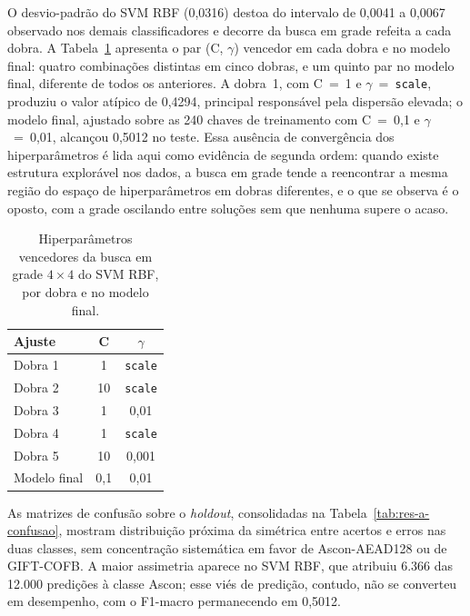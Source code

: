 O desvio-padrão do SVM RBF (0,0316) destoa do intervalo de 0,0041 a 0,0067 observado nos demais classificadores e decorre da busca em grade refeita a cada dobra. A Tabela~\ref{tab:res-a-svm} apresenta o par (C, $\gamma$) vencedor em cada dobra e no modelo final: quatro combinações distintas em cinco dobras, e um quinto par no modelo final, diferente de todos os anteriores. A dobra~1, com C~=~1 e $\gamma$~=~\texttt{scale}, produziu o valor atípico de 0,4294, principal responsável pela dispersão elevada; o modelo final, ajustado sobre as 240 chaves de treinamento com C~=~0,1 e $\gamma$~=~0,01, alcançou 0,5012 no teste. Essa ausência de convergência dos hiperparâmetros é lida aqui como evidência de segunda ordem: quando existe estrutura explorável nos dados, a busca em grade tende a reencontrar a mesma região do espaço de hiperparâmetros em dobras diferentes, e o que se observa é o oposto, com a grade oscilando entre soluções sem que nenhuma supere o acaso.

\begin{table}[htb]
\centering
\caption{Hiperparâmetros vencedores da busca em grade $4 \times 4$ do SVM RBF, por dobra e no modelo final.}
\label{tab:res-a-svm}
\begin{tabular}{lcc}
\toprule
Ajuste & C & $\gamma$ \\
\midrule
Dobra 1 & 1   & \texttt{scale} \\
Dobra 2 & 10  & \texttt{scale} \\
Dobra 3 & 1   & 0,01 \\
Dobra 4 & 1   & \texttt{scale} \\
Dobra 5 & 10  & 0,001 \\
Modelo final & 0,1 & 0,01 \\
\bottomrule
\end{tabular}
\end{table}

As matrizes de confusão sobre o \textit{holdout}, consolidadas na Tabela~\ref{tab:res-a-confusao}, mostram distribuição próxima da simétrica entre acertos e erros nas duas classes, sem concentração sistemática em favor de Ascon-AEAD128 ou de GIFT-COFB. A maior assimetria aparece no SVM RBF, que atribuiu 6.366 das 12.000 predições à classe Ascon; esse viés de predição, contudo, não se converteu em desempenho, com o F1-macro permanecendo em 0,5012.


